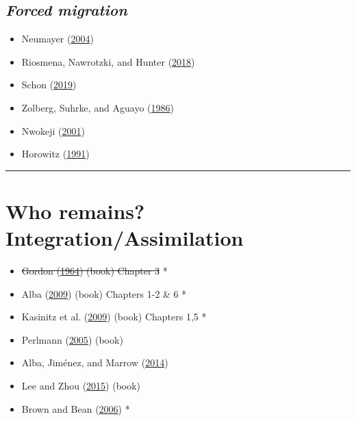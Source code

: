 \documentclass[
]{article}
\providecommand{\tightlist}{%
  \setlength{\itemsep}{0pt}\setlength{\parskip}{0pt}}
\begin{document}
\hypertarget{forced-migration}{%
\subsection{\texorpdfstring{\emph{Forced
migration}}{Forced migration}}\label{forced-migration}}

\begin{itemize}
\tightlist
\item
  Neumayer (\protect\hyperlink{ref-neumayer2004asylum}{2004})
\item
  Riosmena, Nawrotzki, and Hunter
  (\protect\hyperlink{ref-riosmena2018climate}{2018})
\item
  Schon (\protect\hyperlink{ref-schon2019motivation}{2019})
\item
  Zolberg, Suhrke, and Aguayo
  (\protect\hyperlink{ref-zolberg1986international}{1986})
\item
  Nwokeji (\protect\hyperlink{ref-nwokeji2001african}{2001})
\item
  Horowitz (\protect\hyperlink{ref-horowitz1991victims}{1991})
\end{itemize}

\begin{center}\rule{0.5\linewidth}{0.5pt}\end{center}

\hypertarget{who-remains-integrationassimilation}{%
\section{\texorpdfstring{\textbf{Who remains?
Integration/Assimilation}}{Who remains? Integration/Assimilation}}\label{who-remains-integrationassimilation}}

\begin{itemize}
\tightlist
\item
  \sout{Gordon (\protect\hyperlink{ref-gordon1964assimilation}{1964})
  (book) Chapter 3} *
\item
  Alba (\protect\hyperlink{ref-alba2009remaking}{2009}) (book) Chapters
  1-2 \& 6 *
\item
  Kasinitz et al. (\protect\hyperlink{ref-kasinitz2009inheriting}{2009})
  (book) Chapters 1,5 *
\item
  Perlmann (\protect\hyperlink{ref-perlmann2005italians}{2005}) (book)
\item
  Alba, Jiménez, and Marrow
  (\protect\hyperlink{ref-alba2014mexican}{2014})
\item
  Lee and Zhou (\protect\hyperlink{ref-lee2015asian}{2015}) (book)
\item
  Brown and Bean (\protect\hyperlink{ref-brown2006assimilation}{2006}) *
\end{itemize}
\end{document}
